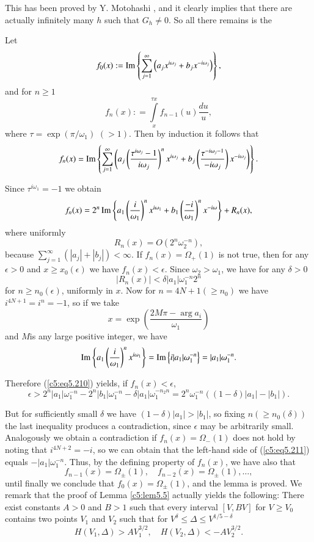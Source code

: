 This has been proved by Y. Motohashi \cite{Motohashi7}, and it clearly
implies that there are actually infinitely many $h$ such that $G_h
\neq 0$. So all there remains is the  

\medskip
{}
 Let
$$
f_0 (x) : = \operatorname{Im} \left\{ \sum\limits^\infty_{j=1} \left(a_j
x^{i\omega_j} + b_j x^{-i\omega_j}\right)\right\}, 
$$
and for $ n \geq 1$
$$
f_n(x) : = \int\limits^{\tau x}_x f_{n-1} (u) \frac{du}{u},
$$
where $\tau = \exp (\pi / \omega_1) $ $(> 1)$. Then by induction it
follows that  
$$
f_n (x) = \operatorname{Im} \left\{ \sum\limits^\infty_{j=1} \left(a_j
\left(\frac{\tau^{i\omega_j} -1}{i\omega_j} \right)^{n} x^{i\omega_j}
+ b_j \left(\frac{\tau^{-i\omega_j -1}}{-i\omega_j}  \right)
x^{-i\omega_j}\right)\right\}. 
$$

Since $\tau^{i\omega_1} = - 1$ we obtain
\begin{equation}
f_n(x) = 2^n \operatorname{Im} \left\{a_1 \left(\frac{i}{\omega_1} \right)^n
x^{i\omega_1} + b_1 \left(\frac{-i}{\omega_1} \right)^n x^{-i\omega}
\right\} + R_n (x),\label{c5:eq5.210} 
\end{equation}
where uniformly
$$
R_n (x) = O (2^n \omega^{-n}_2),
$$
because $\sum\limits^\infty_{j=1} (|a_j|+ |b_j|) < \infty$. If $f_n(x)
= \Omega_+(1)$ is not true, then for any $\epsilon  > 0$ and $x \geq
x_0 (\epsilon)$ we have $f_n(x) < \epsilon$. Since $\omega_2 >
\omega_1$, we have for any $\delta  >0$ 
$$
|R_n(x)| < \delta |a_1| \omega^{-n}_1 2^n
$$
for $ n \geq n_0 (\epsilon)$, uniformly in $x$. Now for $n = 4 N +
1(\geq n_0)$ we have $i^{4N+1} = i^n = -1$, so if we take  
$$
x = \exp \left( \frac{2M\pi - \arg a_i}{\omega_1}\right)
$$
and $M$\pageoriginale is any large positive integer, we have 
\begin{equation}
\operatorname{Im} \left\{a_1 \left(\frac{i}{\omega_1} \right)^n x^{i\omega_1}
\right\} = \operatorname{Im} \left\{i |a_1| \omega^{-n}_1 \right\} = |a_1|
\omega^{-n}_1.\label{c5:eq5.211} 
\end{equation}

Therefore (\ref{c5:eq5.210}) yields, if $f_n(x) < \epsilon$,
$$
\epsilon > 2^n |a_1| \omega^{-n}_1 - 2^n |b_1| \omega^{-n}_1 -\delta
|a_1| \omega^{-n_2 n}_1 = 2^n \omega^{-n}_1 ((1-\delta) |a_1| -
|b_1|). 
$$

But for sufficiently small $\delta$ we have $(1-\delta)|a_1| > |b_1|$,
so fixing $n(\geq n_0(\delta))$ the last inequality produces a
contradiction, since $\epsilon$ may be arbitrarily small. Analogously
we obtain a contradiction if $f_n(x) = \Omega_-(1)$ does not hold by
noting that $i^{4N+2} =- i$, so we can obtain that the left-hand side
of (\ref{c5:eq5.211}) equals $-|a_1| \omega^{-n}_1$. Thus, by the
defining property of $f_n (x)$, we have also that 
$$
f_{n-1}(x) = \Omega_{\pm} (1), \quad f_{n-2} (x) = \Omega_{\pm} (1),
\ldots,  
$$
until finally we conclude that $f_0(x) = \Omega_{\pm} (1)$, and the
lemma is proved. We remark that the proof of Lemma \ref{c5:lem5.5}
actually yields the following: There exist constants $A>0$ and $B > 1$
such that every interval $[V, BV]$ for $V \geq V_0$ contains two
points $V_1$ and $V_2$ such that for $V^\delta \leq \Delta \leq
V^{1/5-\delta}$ 
$$
H(V_1, \Delta) > AV^{3/2}_1,\quad H(V_2,\Delta) < -AV^{3/2}_2. 
$$

